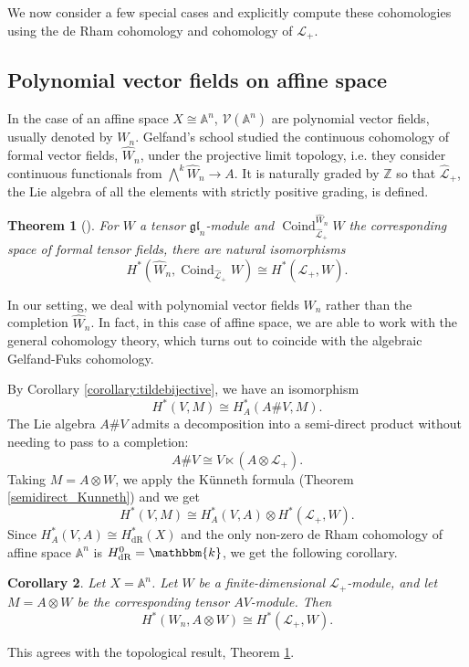 \documentclass[12pt]{amsart}
\newcommand{\affine}{{\mathbb{A}}}
\newcommand{\gl}{{\mathfrak{gl}}}
\renewcommand{\k}{{\mathbbm{k}}}
\renewcommand{\L}{{\mathcal{L}}}
\newcommand{\V}{{\mathcal{V}}}
\newcommand{\Z}{{\mathbb{Z}}}
\newcommand{\Coind}{{\operatorname{Coind}}}
\renewcommand{\sp}{{\#}}
\newtheorem{theorem}{Theorem}[section]
\newtheorem{corollary}[theorem]{Corollary}
\theoremstyle{definition}
\begin{document}
We now consider a few special cases and explicitly compute these cohomologies using the de Rham cohomology and cohomology of $\L_+$. 

\subsection{Polynomial vector fields on affine space}\label{section:polynomial}

In the case of an affine space $X \cong \affine^n$, $\V(\affine^n)$ are polynomial vector fields, usually denoted by $W_n$. Gelfand's school studied the continuous cohomology of formal vector fields, $\widehat{W}_n$, under the projective limit topology, i.e. they consider continuous functionals from $\bigwedge^k \widehat{W}_n \rightarrow A$. It is naturally graded by $\Z$ so that $\widehat{\L}_+$, the Lie algebra of all the elements with strictly positive grading, is defined. 

\begin{theorem}[{\cite[Theorem 1.5.4]{Fuks1986}}]
\label{theorem:theorem1.5.4}
For $W$ a tensor $\gl_n$-module and $\Coind^{\widehat{W}_n}_{\widehat{\L}_+} W$ the corresponding space of formal tensor fields, there are natural isomorphisms
\[
H^*(\widehat{W}_n, \Coind_{\widehat{\L}_+} W) \cong H^* (\widehat{\L}_+, W).
\]
\end{theorem}
In our setting, we deal with polynomial vector fields $W_n$ rather than the completion $\widehat{W}_n$. In fact, in this case of affine space, we are able to work with the general cohomology theory, which turns out to coincide with the algebraic Gelfand-Fuks cohomology.

By Corollary \ref{corollary:tildebijective}, we have an isomorphism
\[
H^*(V, M) \cong H_A^*(A \sp V, M).
\]
The Lie algebra $A \sp V$ admits a decomposition into a semi-direct product without needing to pass to a completion:
\[
A \sp V \cong V \ltimes (A \otimes \L_+).
\]
Taking $M = A \otimes W$, we apply the K\"unneth formula (Theorem \ref{semidirect_Kunneth}) and we get
\[
H^*(V, M) \cong H^*_A (V, A) \otimes H^*(\L_+, W).
\]
Since $H^*_A (V, A) \cong H^*_\text{dR}(X)$ and the only non-zero de Rham cohomology of  affine space $\affine^n$ is $H^0_\text{dR} = \k$, we get the following corollary. 
\begin{corollary}
Let $X = \affine^n$. Let $W$ be a finite-dimensional $\L_+$-module, and let $M = A \otimes W$ be the corresponding tensor $AV$-module. Then 
\[
H^*(W_n, A \otimes W) \cong H^*(\L_+, W).
\]
\end{corollary}
This agrees with the topological result, Theorem \ref{theorem:theorem1.5.4}. 
\end{document}

